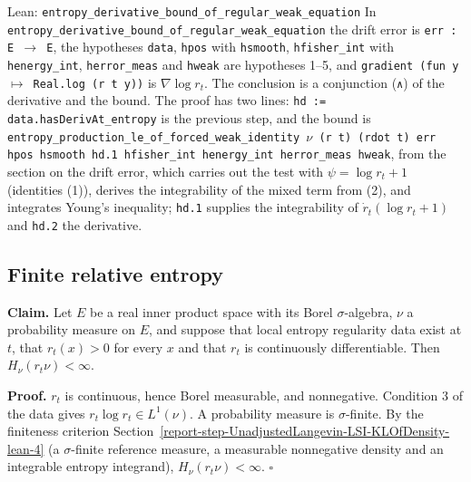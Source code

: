 \documentclass[11pt,a4paper]{report}
\begin{document}
\begin{leanbox}{Lean: \texttt{entropy\_\allowbreak{}derivative\_\allowbreak{}bound\_\allowbreak{}of\_\allowbreak{}regular\_\allowbreak{}weak\_\allowbreak{}equation}}
In \texttt{entropy\_\allowbreak{}derivative\_\allowbreak{}bound\_\allowbreak{}of\_\allowbreak{}regular\_\allowbreak{}weak\_\allowbreak{}equation} the drift error is \texttt{err : E \ensuremath{\to} E}, the hypotheses \texttt{data}, \texttt{hpos} with \texttt{hsmooth}, \texttt{hfisher\_\allowbreak{}int} with \texttt{henergy\_\allowbreak{}int}, \texttt{herror\_\allowbreak{}meas} and \texttt{hweak} are hypotheses 1–5, and \texttt{gradient (fun y \ensuremath{\mapsto} Real.\allowbreak{}log (r t y))} is \(\nabla\log r_t\). The conclusion is a conjunction (\texttt{∧}) of the derivative and the bound. The proof has two lines: \texttt{hd := data.\allowbreak{}has\allowbreak{}Deriv\allowbreak{}At\_\allowbreak{}entropy} is the previous step, and the bound is \texttt{entropy\_\allowbreak{}production\_\allowbreak{}le\_\allowbreak{}of\_\allowbreak{}forced\_\allowbreak{}weak\_\allowbreak{}identity \ensuremath{\nu} (r t) (rdot t) err hpos hsmooth hd.\allowbreak{}1 hfisher\_\allowbreak{}int henergy\_\allowbreak{}int herror\_\allowbreak{}meas hweak}, from the section on the drift error, which carries out the test with \(\psi=\log r_t+1\) (identities (1)), derives the integrability of the mixed term from (2), and integrates Young's inequality; \texttt{hd.\allowbreak{}1} supplies the integrability of \(\dot r_t(\log r_t+1)\) and \texttt{hd.\allowbreak{}2} the derivative.
\end{leanbox}
\subsection{\texorpdfstring{Finite relative entropy}{Finite relative entropy}}
\label{report-step-UnadjustedLangevin-LSI-Regularity-lean-4}


\textbf{Claim.} Let \(E\) be a real inner product space with its Borel \(\sigma\)-algebra, \(\nu\) a probability measure on \(E\), and suppose that local entropy regularity data exist at \(t\), that \(r_t(x)>0\) for every \(x\) and that \(r_t\) is continuously differentiable. Then \(H_\nu(r_t\nu)<\infty\).




\textbf{Proof.} \(r_t\) is continuous, hence Borel measurable, and nonnegative. Condition 3 of the data gives \(r_t\log r_t\in L^1(\nu)\). A probability measure is \(\sigma\)-finite. By the finiteness criterion Section~\ref{report-step-UnadjustedLangevin-LSI-KLOfDensity-lean-4} (a \(\sigma\)-finite reference measure, a measurable nonnegative density and an integrable entropy integrand), \(H_\nu(r_t\nu)<\infty\). \(\square\)
\end{document}
